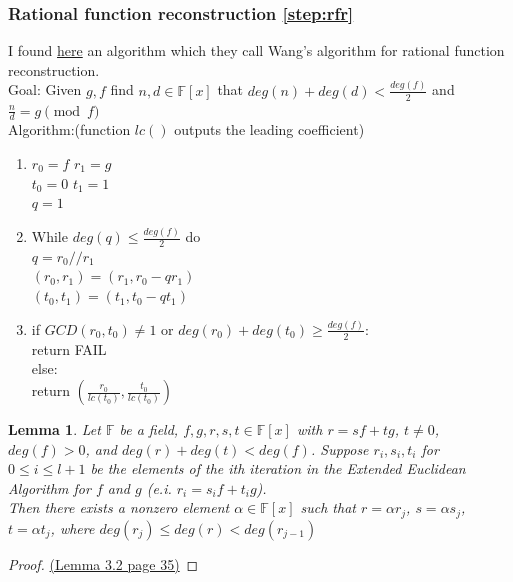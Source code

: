\documentclass[12pt]{article}
\newtheorem{lemma}{Lemma}
\begin{document}
\subsubsection{Rational function reconstruction \ref{step:rfr}}
\label{subsubsec:rfr}
I found \href{http://www.cecm.sfu.ca/~mmonagan/papers/fastRFR.pdf}{here}
an algorithm which they call Wang's algorithm for rational function reconstruction.\\
Goal: Given $g,f$ find $n, d \in \mathbb{F}[x]$ that $deg(n) + deg(d) < \frac{deg(f)}{2}$ and $\frac{n}{d} = g \pmod{f}$\\
Algorithm:(function $lc()$ outputs the leading coefficient)
\begin{enumerate}
    \item   $r_0 = f$  $r_1 = g$\\
            $t_0 = 0$  $t_1 = 1$\\
            $q = 1$\\
    \item While $deg(q) \leq \frac{deg(f)}{2}$ do\\
            $q = r_0 // r_1$\\
            $(r_0, r_1) = (r_1, r_0 - qr_1)$\\
            $(t_0, t_1) = (t_1, t_0 - qt_1)$\\
    \item if $GCD(r_0, t_0) \neq 1$ or $deg(r_0) + deg(t_0) \geq \frac{deg(f)}{2}$:\\
            return FAIL\\
          else:\\
            return $(\frac{r_0}{lc(t_0)}, \frac{t_0}{lc(t_0)})$
\end{enumerate}
\begin{lemma}
Let $\mathbb{F}$ be a field, $f, g, r, s, t \in \mathbb{F}[x]$ with $r = sf + tg$, $t \neq 0$, $deg(f) > 0$, and $deg(r) + deg(t) <deg(f)$.
Suppose $r_i, s_i, t_i$ for $0 \leq i \leq l + 1$ be the elements of the ith iteration in the Extended Euclidean Algorithm for $f$ and $g$ (e.i. $r_i = s_if + t_ig$). \\
Then there exists a nonzero element $\alpha \in \mathbb{F}[x]$ such that $r = \alpha r_j$, $s = \alpha s_j$, $t = \alpha t_j$, where $deg(r_j) \leq deg(r) < deg(r_{j-1})$
\end{lemma}
\begin{proof}
\href{http://www.cecm.sfu.ca/~mmonagan/theses/sara.pdf}{(Lemma 3.2 page 35)}
\end{proof}
\end{document}
